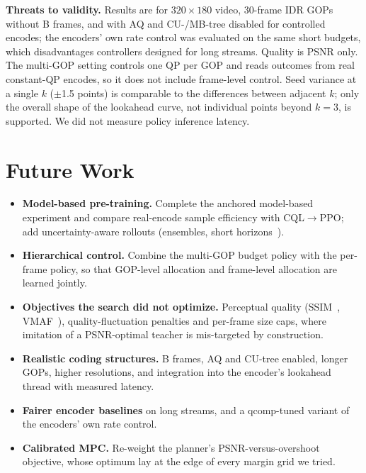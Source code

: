 \documentclass[conference]{IEEEtran}
\newcommand{\cqlppo}{CQL$\to$PPO}
\begin{document}
\textbf{Threats to validity.} Results are for $320{\times}180$ video, 30-frame IDR GOPs without B frames, and with AQ and CU-/MB-tree disabled for controlled encodes; the encoders' own rate control was evaluated on the same short budgets, which disadvantages controllers designed for long streams. Quality is PSNR only. The multi-GOP setting controls one QP per GOP and reads outcomes from real constant-QP encodes, so it does not include frame-level control. Seed variance at a single $k$ ($\pm$1.5 points) is comparable to the differences between adjacent $k$; only the overall shape of the lookahead curve, not individual points beyond $k{=}3$, is supported. We did not measure policy inference latency.

\section{Future Work}
\begin{itemize}
\item \textbf{Model-based pre-training.} Complete the anchored model-based experiment and compare real-encode sample efficiency with \cqlppo; add uncertainty-aware rollouts (ensembles, short horizons~\cite{janner2019mbpo}).
\item \textbf{Hierarchical control.} Combine the multi-GOP budget policy with the per-frame policy, so that GOP-level allocation and frame-level allocation are learned jointly.
\item \textbf{Objectives the search did not optimize.} Perceptual quality (SSIM~\cite{wang2004ssim}, VMAF~\cite{li2016vmaf}), quality-fluctuation penalties and per-frame size caps, where imitation of a PSNR-optimal teacher is mis-targeted by construction.
\item \textbf{Realistic coding structures.} B frames, AQ and CU-tree enabled, longer GOPs, higher resolutions, and integration into the encoder's lookahead thread with measured latency.
\item \textbf{Fairer encoder baselines} on long streams, and a qcomp-tuned variant of the encoders' own rate control.
\item \textbf{Calibrated MPC.} Re-weight the planner's PSNR-versus-overshoot objective, whose optimum lay at the edge of every margin grid we tried.
\end{itemize}

\end{document}
